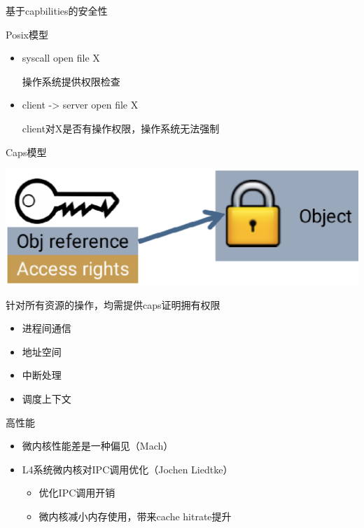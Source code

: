 \documentclass[presentation,dvipdfmx,CJKbookmarks]{beamer}
\begin{document}
\begin{CJK*}{UTF8}{simsun}
\begin{frame}[label={sec:org9c6b16f}]{基于\thinspace capbilities\thinspace 的安全性}
\begin{block}{Posix\thinspace 模型}
\begin{itemize}
\item syscall open file X

操作系统提供权限检查
\item client -> server open file X

client\thinspace 对\thinspace X\thinspace 是否有操作权限，操作系统无法强制
\end{itemize}
\end{block}
\end{frame}

\begin{frame}[label={sec:org55161a9}]{Caps\thinspace 模型}
\begin{center}
\includegraphics[width=.9\linewidth]{./images/caps-key.ps}
\end{center}

针对所有资源的操作，均需提供\thinspace caps\thinspace 证明拥有权限
\begin{itemize}
\item 进程间通信
\item 地址空间
\item 中断处理
\item 调度上下文
\end{itemize}
\end{frame}

\begin{frame}[label={sec:org5b7125a}]{高性能}
\begin{itemize}
\item 微内核性能差是一种偏见（Mach）
\item L4\thinspace 系统微内核对\thinspace IPC\thinspace 调用优化（Jochen Liedtke）
\begin{itemize}
\item 优化\thinspace IPC\thinspace 调用开销
\item 微内核减小内存使用，带来\thinspace cache hitrate\thinspace 提升
\end{itemize}
\end{itemize}
\end{frame}


\end{CJK*}
\end{document}
